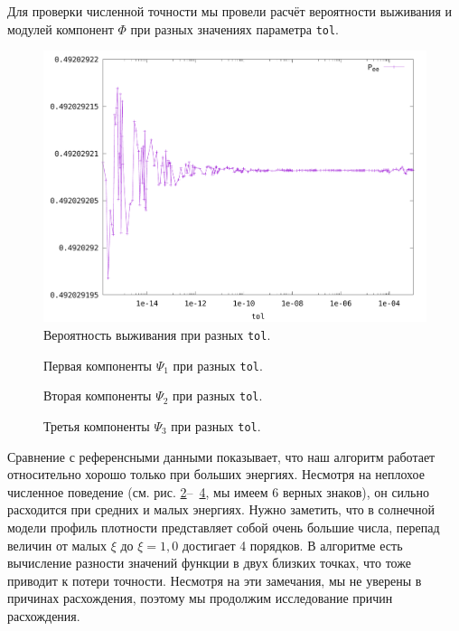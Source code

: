 \documentclass[12pt]{article}
\begin{document}
Для проверки численной точности мы провели расчёт вероятности выживания и
модулей компонент \(\Phi\) при разных значениях параметра \verb|tol|.

\begin{figure}[h]
  \hspace*{1cm}
  \includegraphics[scale=0.8]{sun_Pee}
  \caption{\label{fig:8}Вероятность выживания при разных \texttt{tol}.}
\end{figure}

\begin{figure}[h]
  \hspace*{-2em}
  \caption{\label{fig:9}Первая компоненты \(\Psi_{1}\) при разных \texttt{tol}.}
\end{figure}

\begin{figure}[h]
  \hspace*{-2em}
  \caption{\label{fig:10}Вторая компоненты \(\Psi_{2}\) при разных \texttt{tol}.}
\end{figure}

\begin{figure}[h]
  \hspace*{-2em}
  \caption{\label{fig:11}Третья компоненты \(\Psi_{3}\) при разных \texttt{tol}.}
\end{figure}

Сравнение с референсными данными показывает, что наш алгоритм работает
относительно хорошо только при больших энергиях. Несмотря на неплохое численное
поведение (см. рис. \ref{fig:9}–~\ref{fig:11}, мы имеем 6 верных знаков), он
сильно расходится при средних и малых энергиях. Нужно заметить, что в солнечной
модели профиль плотности представляет собой очень большие числа, перепад величин
от малых \(\xi\) до \(\xi=1{,}0\) достигает 4 порядков. В алгоритме есть
вычисление разности значений функции в двух близких точках, что тоже приводит к
потери точности. Несмотря на эти замечания, мы не уверены в причинах
расхождения, поэтому мы продолжим исследование причин расхождения.
\end{document}
